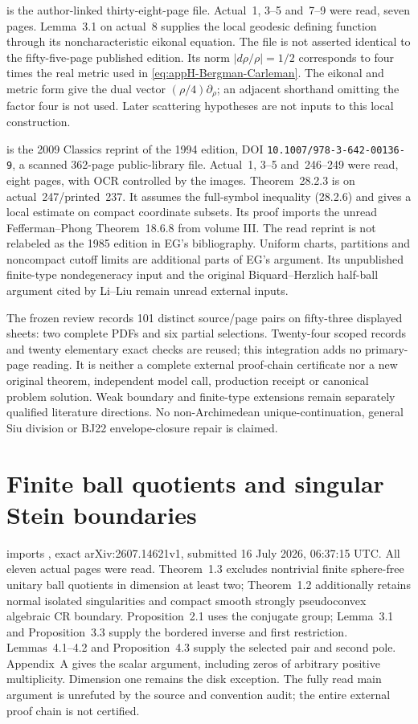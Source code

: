 \cite{GuillarmouSaBarretoACHAuthorCopy} is the author-linked
thirty-eight-page file. Actual~1, 3--5 and~7--9 were read, seven
pages. Lemma~3.1 on actual~8 supplies the local geodesic defining
function through its noncharacteristic eikonal equation. The
file is not asserted identical to the fifty-five-page published
edition. Its norm $|d\rho/\rho|=1/2$ corresponds to four times
the real metric used in \eqref{eq:appH-Bergman-Carleman}.
The eikonal and metric form give the dual vector
$(\rho/4)\partial_\rho$; an adjacent shorthand omitting the
factor four is not used. Later scattering hypotheses are not
inputs to this local construction.

\cite{HormanderIV09Reprint} is the 2009 Classics reprint of the
1994 edition, DOI \nolinkurl{10.1007/978-3-642-00136-9}, a
scanned 362-page public-library file. Actual~1, 3--5 and~246--249
were read, eight pages, with OCR controlled by the images.
Theorem~28.2.3 is on actual~247/printed~237. It assumes the
full-symbol inequality (28.2.6) and gives a local estimate on
compact coordinate subsets. Its proof imports the unread
Fefferman--Phong Theorem~18.6.8 from volume III. The read reprint
is not relabeled as the 1985 edition in EG's bibliography.
Uniform charts, partitions and noncompact cutoff limits are
additional parts of EG's argument. Its unpublished finite-type
nondegeneracy input and the original Biquard--Herzlich half-ball
argument cited by Li--Liu remain unread external inputs.

The frozen review records 101 distinct source/page pairs on
fifty-three displayed sheets: two complete PDFs and six partial
selections. Twenty-four scoped records and twenty elementary
exact checks are reused; this integration adds no primary-page
reading. It is neither a complete external proof-chain
certificate nor a new original theorem, independent model call,
production receipt or canonical problem solution. Weak boundary
and finite-type extensions remain separately qualified literature
directions. No non-Archimedean unique-continuation, general Siu
division or BJ22 envelope-closure repair is claimed.

\section{Finite ball quotients and singular Stein boundaries}
\label{sec:provenance-ball-quotients}

 imports
\cite{GangulySahi26BallQuotientsV1}, exact arXiv:2607.14621v1,
submitted 16 July 2026, 06:37:15 UTC. All eleven actual pages
were read. Theorem~1.3 excludes nontrivial finite sphere-free
unitary ball quotients in dimension at least two; Theorem~1.2
additionally retains normal isolated singularities and compact
smooth strongly pseudoconvex algebraic CR boundary. Proposition~2.1
uses the conjugate group; Lemma~3.1 and Proposition~3.3 supply
the bordered inverse and first restriction. Lemmas~4.1--4.2
and Proposition~4.3 supply the selected pair and second pole.
Appendix~A gives the scalar argument, including zeros of arbitrary
positive multiplicity. Dimension one remains the disk exception.
The fully read main argument is unrefuted by the source and
convention audit; the entire external proof chain is not certified.

